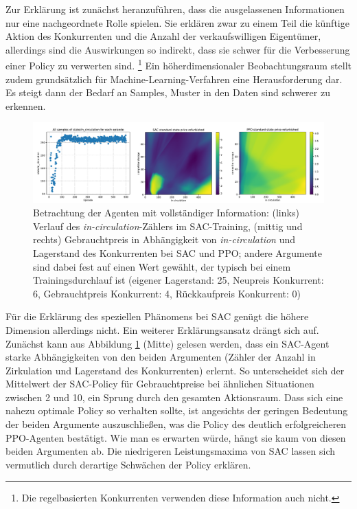 Zur Erklärung ist zunächst heranzuführen, dass die ausgelassenen Informationen nur eine nachgeordnete Rolle spielen.
Sie erklären zwar zu einem Teil die künftige Aktion des Konkurrenten und die Anzahl der verkaufswilligen Eigentümer, allerdings sind die Auswirkungen so indirekt, dass sie schwer für die Verbesserung einer Policy zu verwerten sind. \footnote{Die regelbasierten Konkurrenten verwenden diese Information auch nicht.}
Ein höherdimensionaler Beobachtungsraum stellt zudem grundsätzlich für Machine-Learning-Verfahren eine Herausforderung dar.
Es steigt dann der Bedarf an Samples, Muster in den Daten sind schwerer zu erkennen.

\begin{figure}[htb]
	\centering
	\includegraphics[width=\textwidth]{main/sac_in_circulation_dependend_explanation.pdf}
	\caption{Betrachtung der Agenten mit vollständiger Information: (links) Verlauf des \textit{in-circulation}-Zählers im SAC-Training, (mittig und rechts) Gebrauchtpreis in Abhängigkeit von \textit{in-circulation} und Lagerstand des Konkurrenten bei SAC und PPO; andere Argumente sind dabei fest auf einen Wert gewählt, der typisch bei einem Trainingsdurchlauf ist (eigener Lagerstand: 25, Neupreis Konkurrent: 6, Gebrauchtpreis Konkurrent: 4, Rückkaufpreis Konkurrent: 0)}
	\label{graphic:InCirculationExplain}
\end{figure}
Für die Erklärung des speziellen Phänomens bei SAC genügt die höhere Dimension allerdings nicht.
Ein weiterer Erklärungsansatz drängt sich auf.
Zunächst kann aus Abbildung \ref{graphic:InCirculationExplain} (Mitte) gelesen werden, dass ein SAC-Agent starke Abhängigkeiten von den beiden Argumenten (Zähler der Anzahl in Zirkulation und Lagerstand des Konkurrenten) erlernt.
So unterscheidet sich der Mittelwert der SAC-Policy für Gebrauchtpreise bei ähnlichen Situationen zwischen 2 und 10, ein Sprung durch den gesamten Aktionsraum.
Dass sich eine nahezu optimale Policy so verhalten sollte, ist angesichts der geringen Bedeutung der beiden Argumente auszuschließen, was die Policy des deutlich erfolgreicheren PPO-Agenten bestätigt.
Wie man es erwarten würde, hängt sie kaum von diesen beiden Argumenten ab.
Die niedrigeren Leistungsmaxima von SAC lassen sich vermutlich durch derartige Schwächen der Policy erklären.

